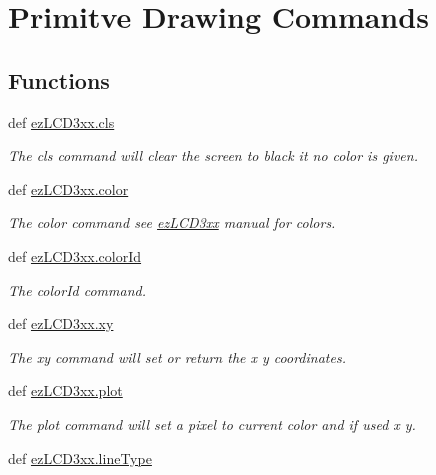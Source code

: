 \hypertarget{group___drawing}{\section{Primitve Drawing Commands}
\label{d7/df0/group___drawing}
}
\subsection*{Functions}
\begin{DoxyCompactItemize}
\item 
def \hyperlink{group___drawing_gacdfb97b09494d0e3cec787014c4863f9}{ez\-L\-C\-D3xx.\-cls}
\begin{DoxyCompactList}\small\item\em The cls command will clear the screen to black it no color is given. \end{DoxyCompactList}\item 
def \hyperlink{group___drawing_ga306a0e99b15bc1122683a1c6e18e7ef0}{ez\-L\-C\-D3xx.\-color}
\begin{DoxyCompactList}\small\item\em The color command see \hyperlink{namespaceez_l_c_d3xx}{ez\-L\-C\-D3xx} manual for colors. \end{DoxyCompactList}\item 
def \hyperlink{group___drawing_ga94dd8d046a01670fc2212b548e29e8d0}{ez\-L\-C\-D3xx.\-color\-Id}
\begin{DoxyCompactList}\small\item\em The color\-Id command. \end{DoxyCompactList}\item 
def \hyperlink{group___drawing_gaf249f02b6ad4e734ffa9d8371f6cab8a}{ez\-L\-C\-D3xx.\-xy}
\begin{DoxyCompactList}\small\item\em The xy command will set or return the x y coordinates. \end{DoxyCompactList}\item 
def \hyperlink{group___drawing_gad3c0ce418a0feea4a0fa40f803c90196}{ez\-L\-C\-D3xx.\-plot}
\begin{DoxyCompactList}\small\item\em The plot command will set a pixel to current color and if used x y. \end{DoxyCompactList}\item 
def \hyperlink{group___drawing_ga9dc821ce2652535899c584d4ff1c1bf7}{ez\-L\-C\-D3xx.\-line\-Type}

\end{DoxyCompactItemize}
